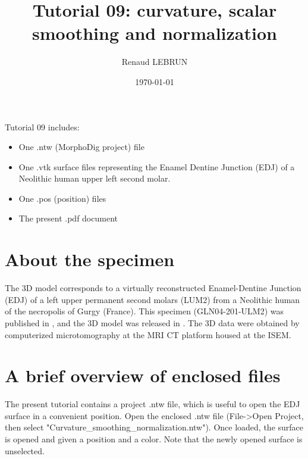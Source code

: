 \documentclass[12pt, a4paper]{book}
\title{Tutorial 09: curvature, scalar smoothing and normalization}
\author{Renaud LEBRUN}
\affil{Institut des Sciences de l'Evolution, Université de Montpellier, France}
\date{\today}
\begin{document}
	\dominitoc

\maketitle


\faketableofcontents



\minitoc 
Tutorial 09 includes:
\begin{itemize}
\item One .ntw (MorphoDig project) file
\item One .vtk surface files representing the Enamel Dentine Junction (EDJ) of a Neolithic human upper left second molar.
\item One .pos (position) files 
\item The present .pdf document
\end{itemize}



\section{About the specimen}
The 3D model corresponds to a virtually reconstructed Enamel-Dentine Junction (EDJ) of a left upper permanent second molars (LUM2) from a Neolithic human of the necropolis of Gurgy (France). This specimen (GLN04-201-ULM2) was published in \citet{LeLuyer2016}, and the 3D model was released in \citet{LeLuyer2016a}.
The 3D data were obtained by computerized microtomography at the MRI \si{\micro}CT platform housed at the ISEM. 


\section{A brief overview of enclosed files}
		
The present tutorial contains a project .ntw file, which is useful to open the EDJ surface in a convenient position. Open the enclosed .ntw file (File->Open Project, then select "Curvature\_smoothing\_normalization.ntw"). Once loaded, the surface is opened and given a position and a color. Note that the newly opened surface is unselected.
\end{document}
